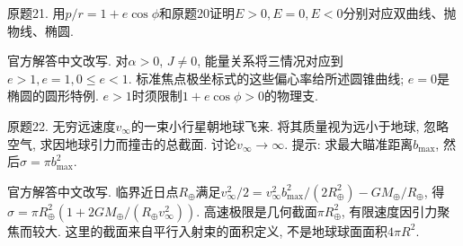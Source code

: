 \begin{exercise}
原题21. 用$p/r=1+e\cos\phi$和原题20证明$E>0,E=0,E<0$分别对应双曲线、抛物线、椭圆.
\end{exercise}
\begin{solution}
官方解答中文改写. 对$\alpha>0$, $J\ne0$, 能量关系将三情况对应到$e>1,e=1,0\le e<1$. 标准焦点极坐标式的这些偏心率给所述圆锥曲线; $e=0$是椭圆的圆形特例. $e>1$时须限制$1+e\cos\phi>0$的物理支.
\end{solution}

\begin{exercise}
原题22. 无穷远速度$v_\infty$的一束小行星朝地球飞来. 将其质量视为远小于地球, 忽略空气, 求因地球引力而撞击的总截面. 讨论$v_\infty\to\infty$. 提示: 求最大瞄准距离$b_{\max}$, 然后$\sigma=\pi b_{\max}^2$.
\end{exercise}
\begin{solution}
官方解答中文改写. 临界近日点$R_\oplus$满足$v_\infty^2/2=v_\infty^2b_{\max}^2/(2R_\oplus^2)-GM_\oplus/R_\oplus$, 得$\sigma=\pi R_\oplus^2(1+2GM_\oplus/(R_\oplus v_\infty^2))$. 高速极限是几何截面$\pi R_\oplus^2$, 有限速度因引力聚焦而较大. 这里的截面来自平行入射束的面积定义, 不是地球球面面积$4\pi R^2$.
\end{solution}
